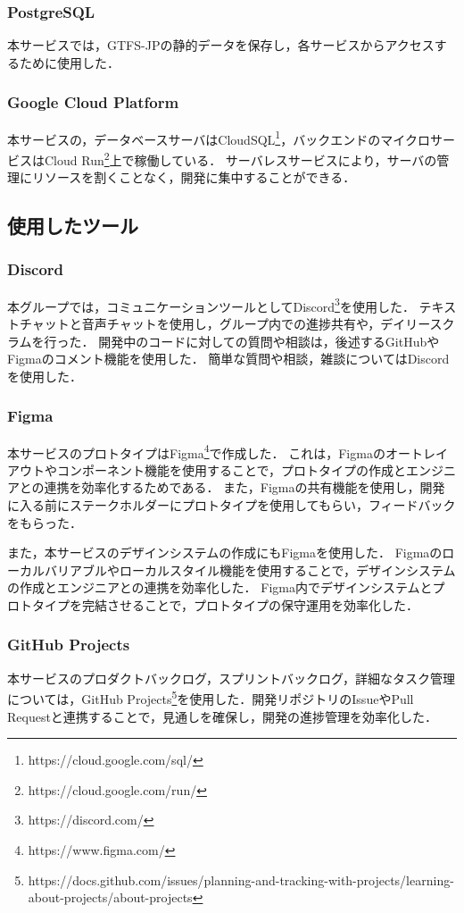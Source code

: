 \subsubsection{PostgreSQL}
本サービスでは，GTFS-JPの静的データを保存し，各サービスからアクセスするために使用した．

\subsubsection{Google Cloud Platform}
本サービスの，データベースサーバはCloudSQL\footnote{https://cloud.google.com/sql/}，バックエンドのマイクロサービスはCloud Run\footnote{https://cloud.google.com/run/}上で稼働している．
サーバレスサービスにより，サーバの管理にリソースを割くことなく，開発に集中することができる．

\subsection{使用したツール}
\subsubsection{Discord}
本グループでは，コミュニケーションツールとしてDiscord\footnote{https://discord.com/}を使用した．
テキストチャットと音声チャットを使用し，グループ内での進捗共有や，デイリースクラムを行った．
開発中のコードに対しての質問や相談は，後述するGitHubやFigmaのコメント機能を使用した．
簡単な質問や相談，雑談についてはDiscordを使用した．

\subsubsection{Figma}
本サービスのプロトタイプはFigma\footnote{https://www.figma.com/}で作成した．
これは，Figmaのオートレイアウトやコンポーネント機能を使用することで，プロトタイプの作成とエンジニアとの連携を効率化するためである．
また，Figmaの共有機能を使用し，開発に入る前にステークホルダーにプロトタイプを使用してもらい，フィードバックをもらった．

また，本サービスのデザインシステムの作成にもFigmaを使用した．
Figmaのローカルバリアブルやローカルスタイル機能を使用することで，デザインシステムの作成とエンジニアとの連携を効率化した．
Figma内でデザインシステムとプロトタイプを完結させることで，プロトタイプの保守運用を効率化した．

\subsubsection{GitHub Projects}
本サービスのプロダクトバックログ，スプリントバックログ，詳細なタスク管理については，GitHub Projects\footnote{https://docs.github.com/issues/planning-and-tracking-with-projects/learning-about-projects/about-projects}を使用した．開発リポジトリのIssueやPull Requestと連携することで，見通しを確保し，開発の進捗管理を効率化した．

